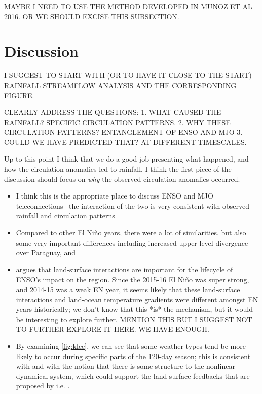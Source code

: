 \documentclass[twocol]{ametsoc}
\begin{document}
MAYBE I NEED TO USE THE METHOD DEVELOPED IN MUNOZ ET AL 2016. OR WE SHOULD EXCISE THIS SUBSECTION.

\section{Discussion}
\label{sec:discussion}

I SUGGEST TO START WITH (OR TO HAVE IT CLOSE TO THE START) RAINFALL STREAMFLOW ANALYSIS AND THE CORRESPONDING FIGURE.

CLEARLY ADDRESS THE QUESTIONS:
1. WHAT CAUSED THE RAINFALL? SPECIFIC CIRCULATION PATTERNS.
2. WHY THESE CIRCULATION PATTERNS? ENTANGLEMENT OF ENSO AND MJO
3. COULD WE HAVE PREDICTED THAT? AT DIFFERENT TIMESCALES.

Up to this point I think that we do a good job presenting what happened, and how the circulation anomalies led to rainfall.
I think the first piece of the discussion should focus on \emph{why} the observed circulation anomalies occurred.
\begin{itemize}
	\item I think this is the appropriate place to discuss ENSO and MJO teleconnections --the interaction of the two is very consistent with observed rainfall and circulation patterns
	\item Compared to other El Ni\~{n}o years, there were a lot of similarities, but also some very important differences including increased upper-level divergence over Paraguay, and
	\item \citet{Grimm2009} argues that land-surface interactions are important for the lifecycle of ENSO's impact on the region.
	Since the 2015-16 El Ni\~no was super strong, and 2014-15 was a weak EN year, it seems likely that these land-surface interactions and land-ocean temperature gradients were different amongst EN years historically; we don't know that this *is* the mechanism, but it would be interesting to explore further. MENTION THIS BUT I SUGGEST NOT TO FURTHER EXPLORE IT HERE. WE HAVE ENOUGH.
	\item By examining \cref{fig:klee}, we can see that some weather types tend be more likely to occur during specific parts of the 120-day season; this is consistent with \citet{Munoz2016} and with the notion that there is some structure to the nonlinear dynamical system, which could support the land-surface feedbacks that are proposed by i.e. \citep{Grimm:2009bq}.
\end{itemize}
\end{document}
